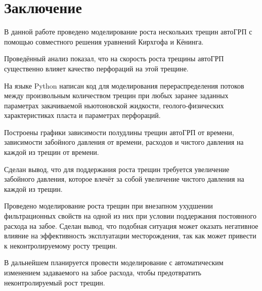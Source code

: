 \chapter*{Заключение} \label{ch-conclusion}

В данной работе проведено моделирование роста нескольких трещин автоГРП с помощью совместного решения уравнений Кирхгофа и Кёнинга.

Проведённый анализ показал, что на скорость роста трещины автоГРП существенно влияет качество перфораций на этой трещине.

На языке Python написан код для моделирования перераспределения потоков между произвольным количеством трещин при любых заранее заданных параметрах закачиваемой ньютоновской жидкости, геолого-физических характеристиках пласта и параметрах перфораций.

Построены графики зависимости полудлины трещин автоГРП от времени, зависимости забойного давления от времени, расходов и чистого давления на каждой из трещин от времени.

Сделан вывод, что для поддержания роста трещин требуется увеличение забойного давления, которое влечёт за собой увеличение чистого давления на каждой из трещин.

Проведено моделирование роста трещин при внезапном ухудшении фильтрационных свойств на одной из них при условии поддержания постоянного расхода на забое.
Сделан вывод, что подобная ситуация может оказать негативное влияние на эффективность эксплуатации месторождения, так как может привести к неконтролируемому росту трещин.

В дальнейшем планируется провести моделирование с автоматическим изменением задаваемого на забое расхода, чтобы предотвратить неконтролируемый рост трещин.
